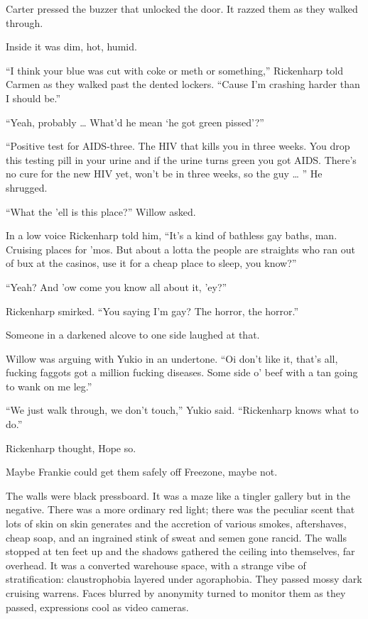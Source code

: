 Carter pressed the buzzer that unlocked the door. It razzed them as they walked through.

Inside it was dim, hot, humid.

“I think your blue was cut with coke or meth or something,” Rickenharp told Carmen as they walked past the dented lockers. “Cause I’m crashing harder than I should be.”

“Yeah, probably … What’d he mean ‘he got green pissed’?”

“Positive test for AIDS-three. The HIV that kills you in three weeks. You drop this testing pill in your urine and if the urine turns green you got AIDS. There’s no cure for the new HIV yet, won’t be in three weeks, so the guy … ” He shrugged.

“What the ’ell is this place?” Willow asked.

In a low voice Rickenharp told him, “It’s a kind of bathless gay baths, man. Cruising places for ’mos. But about a lotta the people are straights who ran out of bux at the casinos, use it for a cheap place to sleep, you know?”

“Yeah? And ’ow come you know all about it, ’ey?”

Rickenharp smirked. “You saying I’m gay? The horror, the horror.”

Someone in a darkened alcove to one side laughed at that.

Willow was arguing with Yukio in an undertone. “Oi don’t like it, that’s all, fucking faggots got a million fucking diseases. Some side o’ beef with a tan going to wank on me leg.”

“We just walk through, we don’t touch,” Yukio said. “Rickenharp knows what to do.”

Rickenharp thought, Hope so.

Maybe Frankie could get them safely off Freezone, maybe not.

The walls were black pressboard. It was a maze like a tingler gallery but in the negative. There was a more ordinary red light; there was the peculiar scent that lots of skin on skin generates and the accretion of various smokes, aftershaves, cheap soap, and an ingrained stink of sweat and semen gone rancid. The walls stopped at ten feet up and the shadows gathered the ceiling into themselves, far overhead. It was a converted warehouse space, with a strange vibe of stratification: claustrophobia layered under agoraphobia. They passed mossy dark cruising warrens. Faces blurred by anonymity turned to monitor them as they passed, expressions cool as video cameras.

